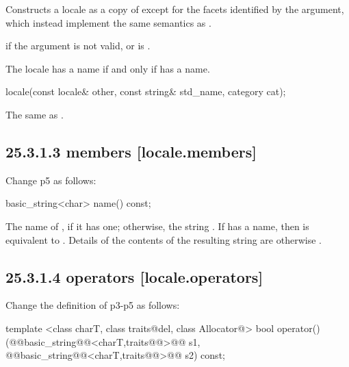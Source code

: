 \documentclass[ebook,11pt,article]{memoir}
\begin{document}
\begin{itemdescr}
\pnum
\effects
Constructs a locale as a copy of
except for the facets identified by the
argument, which instead implement the same semantics as
.

\pnum
\throws
{}
if the argument is not valid, or is  .

\pnum
\remarks
The locale has a name if and only if
has a name.
\end{itemdescr}
\begin{removedblock}
\begin{itemdecl}
locale(const locale& other, const string& std_name, category cat);
\end{itemdecl}

\begin{itemdescr}
\pnum
\effects The same as .
\end{itemdescr}
\end{removedblock}

\subsection{25.3.1.3  members [locale.members]}
Change p5 as follows:

\begin{itemdecl}
basic_string<char> name() const;
\end{itemdecl}

\begin{itemdescr}
\pnum
\returns
The name of
,
if it has one; otherwise, the string .
If
has a name, then
is equivalent to
.
Details of the contents of the resulting string are otherwise .
\end{itemdescr}

\subsection{25.3.1.4  operators [locale.operators]}
Change the definition of  p3-p5 as follows:

\begin{itemdecl}
template <class charT, class traits@del{, class Allocator}@>
  bool operator()(@@basic_string@@<charT,traits@@>@\removed{\&}@ s1,
                  @@basic_string@@<charT,traits@@>@\removed{\&}@ s2) const;
\end{itemdecl}
\end{document}

